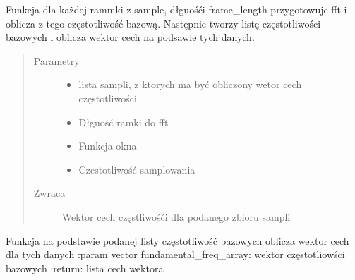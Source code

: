 \documentclass[letterpaper,10pt,polish]{sphinxmanual}
\begin{document}
\begin{fulllineitems}
\label{\detokenize{voice_module:voice_module.get_pitch_feature_vector}}
Funkcja dla każdej rammki z sample, dłguośći frame\_length przygotowuje fft i oblicza z tego częstotliwość bazową.
Następnie tworzy listę częstotliwości bazowych i oblicza wektor cech na podsawie tych danych.
\begin{quote}\begin{description}
\item[{Parametry}] \leavevmode\begin{itemize}
\item {} 
 \textendash{} lista sampli, z ktorych ma być obliczony wetor cech częstotliwości

\item {} 
 \textendash{} Dłguosć ramki do fft

\item {} 
 \textendash{} Funkcja okna

\item {} 
 \textendash{} Czestotliwość samplowania

\end{itemize}

\item[{Zwraca}] \leavevmode
Wektor cech częstliwośći dla podanego zbioru sampli

\end{description}\end{quote}

\end{fulllineitems}


\begin{fulllineitems}
\label{\detokenize{voice_module:voice_module.get_pitch_features}}
Funkcja na podstawie podanej listy częstotliwość bazowych oblicza wektor cech dla tych danych
:param vector fundamental\_freq\_array: wektor częstotliowści bazowych
:return: lista cech wektora

\end{fulllineitems}
\end{document}
